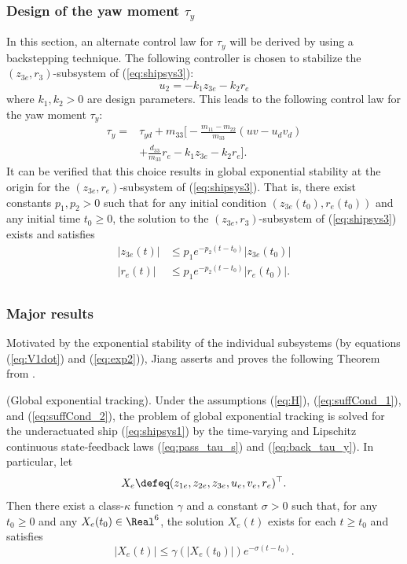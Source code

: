 \documentclass[amsthm, twocolumn]{autart}
\begin{document}
{\subsubsection{Design of the yaw moment $\tau_y$}
\label{sect_backstep_yaw}
In this section, an alternate control law for $\tau_y$ will be derived by using a backstepping technique. The following controller is chosen to stabilize the $(z_{3e},r_3)$-subsystem of (\ref{eq:shipsys3}):
%
%
\begin{equation}
u_2=-k_1 z_{3e} - k_2 r_e
\end{equation}
%
%
where $k_1,k_2>0$ are design parameters. This leads to the following control law for the yaw moment $\tau_y$:
\begin{equation}
\begin{split}
\tau_y=& \tau_{yd}+m_{33} \bigg[-\frac{m_{11}-m_{22}}{m_{33}}(u v - u_d v_d)\\
& + \frac{d_{33}}{m_{33}} r_e - k_1 z_{3e} - k_2 r_e \bigg].
\end{split}
\label{eq:back_tau_y}
\end{equation}
It can be verified that this choice results in global exponential stability at the origin for the $(z_{3e},r_e)$-subsystem of (\ref{eq:shipsys3}). That is, there exist constants $p_1, p_2>0$ such that for any initial condition $(z_{3e}(t_0), r_e(t_0))$ and any initial time $t_0\ge0$, the solution to the $(z_{3e},r_3)$-subsystem of (\ref{eq:shipsys3}) exists and satisfies 
%
%
\begin{equation}
\begin{aligned}
 \left|z_{3e}(t)\right| &\le p_1 e^{-p_2 (t-t_0)} \left|z_{3e}(t_0)\right| \\
 \left|r_e(t)\right| &\le p_1 e^{-p_2 (t-t_0)} \left|r_e(t_0)\right|. \\
\end{aligned}
\label{eq:exp2}
\end{equation}

%
%
\subsubsection{Major results}
Motivated by the exponential stability of the individual subsystems (by equations (\ref{eq:V1dot}) and (\ref{eq:exp2})), Jiang asserts and proves the following Theorem from \cite{Jiang02}.
%
%
\begin{theorem}
(Global exponential tracking). Under the assumptions (\ref{eq:H}), (\ref{eq:suffCond_1}), and (\ref{eq:suffCond_2}), the problem of global exponential tracking is solved for the underactuated ship (\ref{eq:shipsys1}) by the time-varying and Lipschitz continuous state-feedback laws (\ref{eq:pass_tau_s}) and (\ref{eq:back_tau_y}). In particular, let 
%
\[X_e \defeq (z_{1e}, z_{2e}, z_{3e}, u_e, v_e, r_e)^\top. \]
%
Then there exist a class-$\kappa$ function $\gamma$ and a constant $\sigma>0$ such that, for any $t_0 \ge 0$ and any $X_e(t_0) \in \Real^6$, the solution $X_e(t)$ exists for each $t \ge t_0$ and satisfies 
%
\begin{equation}
|X_e(t)| \le \gamma(|X_e(t_0)|)e^{-\sigma(t-t_0)}.
\end{equation}


\end{theorem}}
\end{document}
